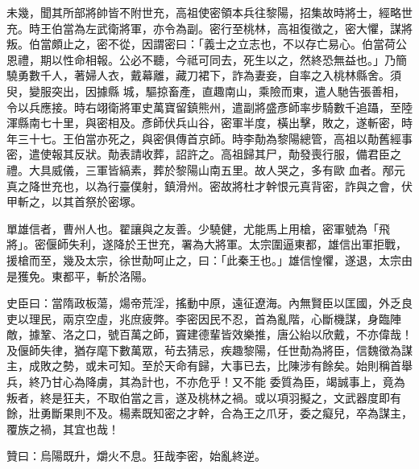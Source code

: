 \begin{pinyinscope}
 未幾，聞其所部將帥皆不附世充，高祖使密領本兵往黎陽，招集故時將士，經略世充。時王伯當為左武衛將軍，亦令為副。密行至桃林，高祖復徵之，密大懼，謀將叛。伯當頗止之，密不從，因謂密曰：「義士之立志也，不以存亡易心。伯當荷公恩禮，期以性命相報。公必不聽，今祗可同去，死生以之，然終恐無益也。」乃簡驍勇數千人，著婦人衣，戴幕離，藏刀裙下，詐為妻妾，自率之入桃林縣舍。須臾，變服突出，因據縣
 城，驅掠畜產，直趣南山，乘險而東，遣人馳告張善相，令以兵應接。時右翊衛將軍史萬寶留鎮熊州，遣副將盛彥師率步騎數千追躡，至陸渾縣南七十里，與密相及。彥師伏兵山谷，密軍半度，橫出擊，敗之，遂斬密，時年三十七。王伯當亦死之，與密俱傳首京師。時李勣為黎陽總管，高祖以勣舊經事密，遣使報其反狀。勣表請收葬，詔許之。高祖歸其尸，勣發喪行服，備君臣之禮。大具威儀，三軍皆縞素，葬於黎陽山南五里。故人哭之，多有歐
 血者。邴元真之降世充也，以為行臺僕射，鎮滑州。密故將杜才幹恨元真背密，詐與之會，伏甲斬之，以其首祭於密塚。



 單雄信者，曹州人也。翟讓與之友善。少驍健，尤能馬上用槍，密軍號為「飛將」。密偃師失利，遂降於王世充，署為大將軍。太宗圍逼東都，雄信出軍拒戰，援槍而至，幾及太宗，徐世勣呵止之，曰：「此秦王也。」雄信惶懼，遂退，太宗由是獲免。東都平，斬於洛陽。



 史臣曰：當隋政板蕩，煬帝荒淫，搖動中原，遠征遼海。內無賢臣以匡國，外乏良吏以理民，兩京空虛，兆庶疲弊。李密因民不忍，首為亂階，心斷機謀，身臨陣敵，據鞏、洛之口，號百萬之師，竇建德輩皆效樂推，唐公紿以欣戴，不亦偉哉！及偃師失律，猶存麾下數萬眾，茍去猜忌，疾趣黎陽，任世勣為將臣，信魏徵為謀主，成敗之勢，或未可知。至於天命有歸，大事已去，比陳涉有餘矣。始則稱首舉兵，終乃甘心為降虜，其為計也，不亦危乎！又不能
 委質為臣，竭誠事上，竟為叛者，終是狂夫，不取伯當之言，遂及桃林之禍。或以項羽擬之，文武器度即有餘，壯勇斷果則不及。楊素既知密之才幹，合為王之爪牙，委之癡兒，卒為謀主，覆族之禍，其宜也哉！



 贊曰：烏陽既升，爝火不息。狂哉李密，始亂終逆。



\end{pinyinscope}